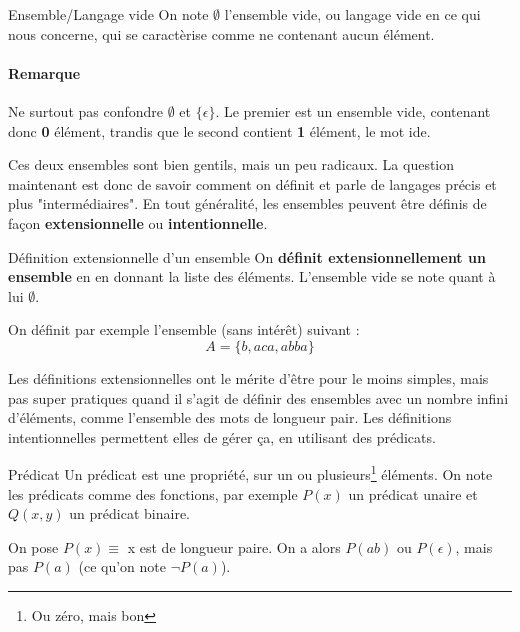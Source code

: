 \begin{definition}{Ensemble/Langage vide}{}
On note $\emptyset$ l'ensemble vide, ou langage vide en ce qui nous concerne, qui se caractèrise comme ne contenant aucun élément.
\end{definition}

\paragraph{Remarque} Ne surtout pas confondre $\emptyset$ et $\{\epsilon\}$. Le premier est un ensemble vide, contenant donc \textbf{0} élément, trandis que le second contient \textbf{1} élément, le mot ide. 

Ces deux ensembles sont bien gentils, mais un peu radicaux. La question maintenant est donc de savoir comment on définit et parle de langages précis et plus "intermédiaires". En tout généralité, les ensembles peuvent être définis de façon \textbf{extensionnelle} ou \textbf{intentionnelle}. 

\begin{definition}{Définition extensionnelle d'un ensemble}{}
On \textbf{définit extensionnellement un ensemble} en en donnant la liste des éléments. L'ensemble vide se note quant à lui $\emptyset$.
\end{definition}

\begin{example} On définit par exemple l'ensemble (sans intérêt) suivant :
\[
    A = \{b, aca, abba\}
\]
\end{example}

Les définitions extensionnelles ont le mérite d'être pour le moins simples, mais pas super pratiques quand il s'agit de définir des ensembles avec un nombre infini d'éléments, comme l'ensemble des mots de longueur pair. Les définitions intentionnelles permettent elles de gérer ça, en utilisant des prédicats.

\begin{definition}{Prédicat}{}
Un prédicat est une propriété, sur un ou plusieurs\footnote{Ou zéro, mais bon} éléments. On note les prédicats comme des fonctions, par exemple $P(x)$ un prédicat unaire et $Q(x,y)$ un prédicat binaire.
\end{definition}

\begin{example}
On pose $P(x) \equiv$ x est de longueur paire. On a alors $P(ab)$ ou $P(\epsilon)$, mais pas $P(a)$ (ce qu'on note $\neg P(a)$). 
\end{example}

